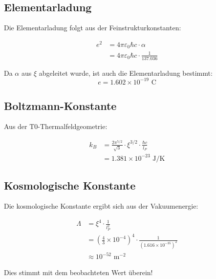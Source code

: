 \documentclass[12pt,a4paper]{article}
\newcommand{\lP}{l_P}
\newcommand{\xipar}{\xi}
\begin{document}
	\subsection{Elementarladung}
	
	Die Elementarladung folgt aus der Feinstrukturkonstanten:
	
	\begin{keyresult}
		\begin{align}
			e^2 &= 4\pi\varepsilon_0\hbar c \cdot \alpha \\
			&= 4\pi\varepsilon_0\hbar c \cdot \frac{1}{137.036}
		\end{align}
		
		Da $\alpha$ aus $\xipar$ abgeleitet wurde, ist auch die Elementarladung bestimmt:
		\begin{equation}
			e = 1.602 \times 10^{-19} \text{ C}
		\end{equation}
	\end{keyresult}
	
	\subsection{Boltzmann-Konstante}
	
	Aus der T0-Thermalfeldgeometrie:
	
	\begin{keyresult}
		\begin{align}
			k_B &= \frac{2\pi^{5/2}}{\sqrt{3}} \cdot \xipar^{3/2} \cdot \frac{\hbar c}{\lP} \\
			&= 1.381 \times 10^{-23} \text{ J/K}
		\end{align}
	\end{keyresult}
	
	\subsection{Kosmologische Konstante}
	
	Die kosmologische Konstante ergibt sich aus der Vakuumenergie:
	
	\begin{keyresult}
		\begin{align}
			\Lambda &= \xipar^4 \cdot \frac{1}{\lP^2} \\
			&= \left(\frac{4}{3} \times 10^{-4}\right)^4 \cdot \frac{1}{(1.616 \times 10^{-35})^2} \\
			&\approx 10^{-52} \text{ m}^{-2}
		\end{align}
		
		Dies stimmt mit dem beobachteten Wert überein!
	\end{keyresult}
	
\end{document}
